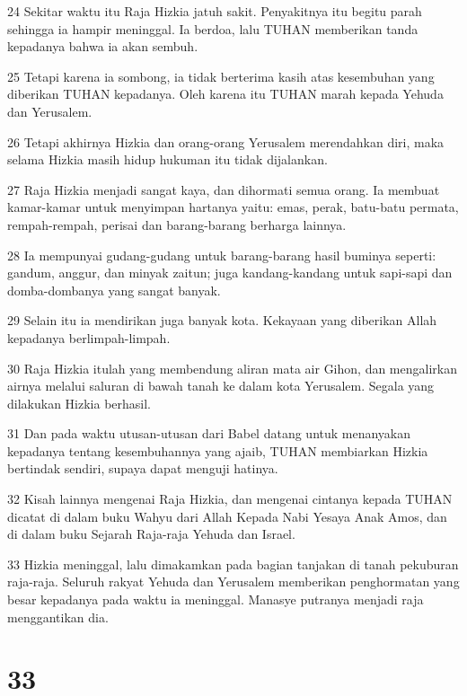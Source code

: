 \par 24 Sekitar waktu itu Raja Hizkia jatuh sakit. Penyakitnya itu begitu parah sehingga ia hampir meninggal. Ia berdoa, lalu TUHAN memberikan tanda kepadanya bahwa ia akan sembuh.
\par 25 Tetapi karena ia sombong, ia tidak berterima kasih atas kesembuhan yang diberikan TUHAN kepadanya. Oleh karena itu TUHAN marah kepada Yehuda dan Yerusalem.
\par 26 Tetapi akhirnya Hizkia dan orang-orang Yerusalem merendahkan diri, maka selama Hizkia masih hidup hukuman itu tidak dijalankan.
\par 27 Raja Hizkia menjadi sangat kaya, dan dihormati semua orang. Ia membuat kamar-kamar untuk menyimpan hartanya yaitu: emas, perak, batu-batu permata, rempah-rempah, perisai dan barang-barang berharga lainnya.
\par 28 Ia mempunyai gudang-gudang untuk barang-barang hasil buminya seperti: gandum, anggur, dan minyak zaitun; juga kandang-kandang untuk sapi-sapi dan domba-dombanya yang sangat banyak.
\par 29 Selain itu ia mendirikan juga banyak kota. Kekayaan yang diberikan Allah kepadanya berlimpah-limpah.
\par 30 Raja Hizkia itulah yang membendung aliran mata air Gihon, dan mengalirkan airnya melalui saluran di bawah tanah ke dalam kota Yerusalem. Segala yang dilakukan Hizkia berhasil.
\par 31 Dan pada waktu utusan-utusan dari Babel datang untuk menanyakan kepadanya tentang kesembuhannya yang ajaib, TUHAN membiarkan Hizkia bertindak sendiri, supaya dapat menguji hatinya.
\par 32 Kisah lainnya mengenai Raja Hizkia, dan mengenai cintanya kepada TUHAN dicatat di dalam buku Wahyu dari Allah Kepada Nabi Yesaya Anak Amos, dan di dalam buku Sejarah Raja-raja Yehuda dan Israel.
\par 33 Hizkia meninggal, lalu dimakamkan pada bagian tanjakan di tanah pekuburan raja-raja. Seluruh rakyat Yehuda dan Yerusalem memberikan penghormatan yang besar kepadanya pada waktu ia meninggal. Manasye putranya menjadi raja menggantikan dia.

\chapter{33}

